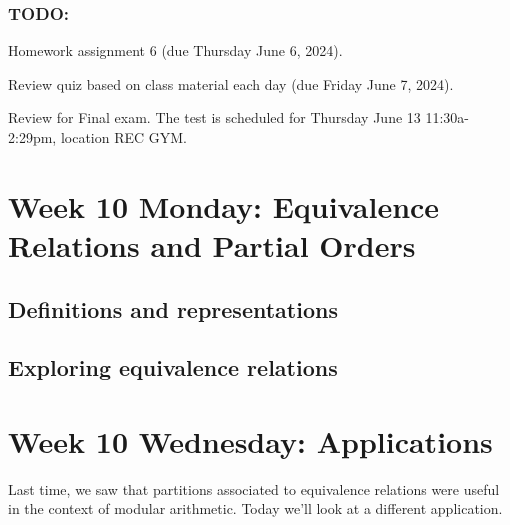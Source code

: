 \subsubsection*{TODO:}
\begin{list}
   {\itemsep2pt}
   \item Homework assignment 6 (due Thursday June 6, 2024).
   \item Review quiz based on class material each day (due Friday June 7, 2024).
   \item Review for Final exam. The test is scheduled for Thursday June 13 11:30a-2:29pm, location REC GYM.
\end{list}

\newpage
\section*{Week 10 Monday: Equivalence Relations and Partial Orders}
\subsection*{Definitions and representations}



\vfill

\vfill
\newpage
\subsection*{Exploring equivalence relations}



\vfill

\vfill
\newpage


\vfill

\vfill
\newpage

\vfill
\newpage

\newpage
\section*{Week 10 Wednesday: Applications}



Last time, we saw that partitions associated to equivalence relations
were useful in the context of modular arithmetic.
Today we'll look at a different application.




